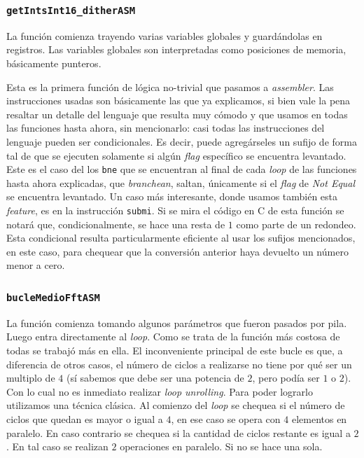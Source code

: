 \documentclass[%
    compressed,
    titlepage,
    narroweqnarray,
    inline,
    twoside,
    ]{ieee}
\begin{document}
\subsubsection{\texttt{getIntsInt16\_ditherASM}}
La funci\'on comienza trayendo varias variables globales y guard\'andolas en registros.
Las variables globales son interpretadas como posiciones de memoria, b\'asicamente punteros.

Esta es la primera funci\'on de l\'ogica no-trivial que pasamos a \textit{assembler}.
Las instrucciones usadas son b\'asicamente las que ya explicamos, si bien vale la pena resaltar un detalle del lenguaje que resulta muy c\'omodo y
que usamos en todas las funciones hasta ahora, sin mencionarlo:
casi todas las instrucciones del lenguaje pueden ser condicionales. Es decir, puede agreg\'arseles un sufijo de forma tal de que se ejecuten solamente
si alg\'un \textit{flag} espec\'ifico se encuentra levantado.
Este es el caso del los \texttt{bne} que se encuentran al final de cada \textit{loop} de las funciones hasta ahora explicadas, que \textit{branchean},
saltan, \'unicamente si el \textit{flag} de \textit{Not Equal} se encuentra levantado.
Un caso m\'as interesante, donde usamos tambi\'en esta \textit{feature}, es en la instrucci\'on \texttt{submi}.
Si se mira el c\'odigo en \textsc{C} de esta funci\'on se notar\'a que, condicionalmente, se hace una resta de $1$ como parte de un redondeo.
Esta condicional resulta particularmente eficiente al usar los sufijos mencionados, en este caso, para chequear que la conversi\'on anterior
haya devuelto un n\'umero menor a cero.


\subsubsection{\texttt{bucleMedioFftASM}}
La funci\'on comienza tomando algunos par\'ametros que fueron pasados por pila.
Luego entra directamente al \textit{loop}.
Como se trata de la funci\'on m\'as costosa de todas se trabaj\'o m\'as en ella.
El inconveniente principal de este bucle es que, a diferencia de otros casos, el n\'umero de ciclos a realizarse no tiene por qu\'e ser
un multiplo de $4$ (s\'i sabemos que debe ser una potencia de $2$, pero pod\'ia ser $1$ o $2$). Con lo cual no es inmediato realizar \textit{loop unrolling}.
Para poder lograrlo utilizamos una t\'ecnica cl\'asica. Al comienzo del \textit{loop} se chequea si el n\'umero de ciclos que quedan es
mayor o igual a $4$, en ese caso se opera con $4$ elementos en paralelo.
En caso contrario se chequea si la cantidad de ciclos restante es igual a $2$. En tal caso se realizan $2$ operaciones en paralelo.
Si no se hace una sola.
\end{document}
